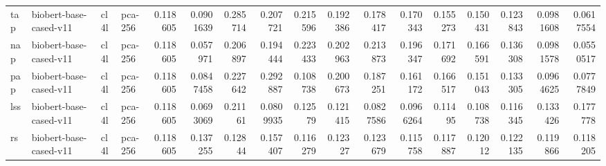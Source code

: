 \begin{tabular}{llllrrrrrrrrrrrrr}
 tap         & biobert-base-cased-v11 & cl4l             & pca-256               &         0.118605 &        0.0901639 &        0.285714  &        0.207721  &         0.215596 &         0.192386 &        0.178417  &        0.170343  &         0.155273 &         0.150431 &          0.123843 &         0.0981608 &         0.0617554 \\
 nap         & biobert-base-cased-v11 & cl4l             & pca-256               &         0.118605 &        0.057971  &        0.206897  &        0.194444  &         0.223433 &         0.202963 &        0.213873  &        0.196347  &         0.171692 &         0.166591 &          0.136308 &         0.0981578 &         0.0550517 \\
 pap         & biobert-base-cased-v11 & cl4l             & pca-256               &         0.118605 &        0.0847458 &        0.227642  &        0.292887  &         0.108738 &         0.200673 &        0.187251  &        0.161172  &         0.166517 &         0.151043 &          0.133305 &         0.0964625 &         0.0777849 \\
 lss         & biobert-base-cased-v11 & cl4l             & pca-256               &         0.118605 &        0.0693069 &        0.21161   &        0.0809935 &         0.12579  &         0.121415 &        0.0827586 &        0.0966264 &         0.11495  &         0.108738 &          0.116345 &         0.133426  &         0.177778  \\
 rs          & biobert-base-cased-v11 & cl4l             & pca-256               &         0.118605 &        0.137255  &        0.12844   &        0.157407  &         0.116279 &         0.12327  &        0.123679  &        0.115758  &         0.117887 &         0.12012  &          0.122135 &         0.119866  &         0.118205  \\
\hline
\end{tabular}